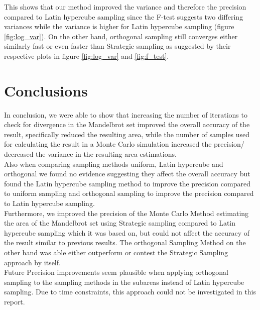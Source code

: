 \documentclass{uva-inf-article}
\begin{document}
This shows that our method improved the variance and therefore the precision compared to Latin hypercube sampling since the F-test suggests two differing variances while the variance is higher for Latin hypercube sampling (figure \ref{fig:log_var}). On the other hand, orthogonal sampling still converges either similarly fast or even faster than Strategic sampling as suggested by their respective plots in figure \ref{fig:log_var} and \ref{fig:f_test}.


\newpage
\section{Conclusions}
In conclusion, we were able to show that increasing the number of iterations to check for divergence in the Mandelbrot set improved the overall accuracy of the result, specifically reduced the resulting area, while the number of samples used for calculating the result in a Monte Carlo simulation increased the precision/ decreased the variance in the resulting area estimations.\\
Also when comparing sampling methods uniform, Latin hypercube and orthogonal we found no evidence suggesting they affect the overall accuracy but found the Latin hypercube sampling method to improve the precision compared to uniform sampling and orthogonal sampling to improve the precision compared to Latin hypercube sampling.\\
Furthermore, we improved the precision of the Monte Carlo Method estimating the area of the Mandelbrot set using Strategic sampling compared to Latin hypercube sampling which it was based on, but could not affect the accuracy of the result similar to previous results.
The orthogonal Sampling Method on the other hand was able either outperform or contest the Strategic Sampling approach by itself. \\
Future Precision improvements seem plausible when applying orthogonal sampling to the sampling methods in the subareas instead of Latin hypercube sampling. Due to time constraints, this approach could not be investigated in this report.

\clearpage
\printbibliography



\end{document}
